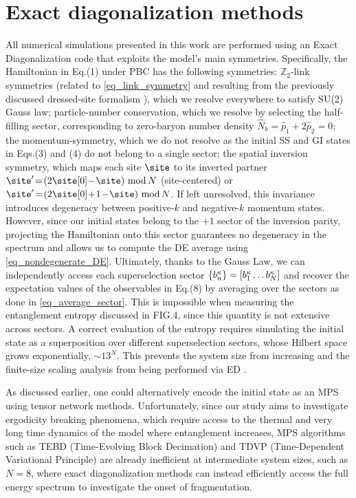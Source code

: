 \documentclass[aps,prl,reprint,twocolumn,superscriptaddress,floatfix,nofootinbib]{revtex4-2}
\begin{document}
\section{Exact diagonalization methods}
All numerical simulations presented in this work are performed using an Exact Diagonalization code \cite{Cataldi2026EdlgtExactDiagonalization, Cataldi2026DataCodeDisorderFree} that exploits the model's main symmetries.
Specifically, the Hamiltonian in Eq.(1) under PBC has the following symmetries: $\mathbb{Z}_{2}$-link symmetries (related to  \cref{eq_link_symmetry} and resulting from the previously discussed dressed-site formalism \cite{Cataldi2024Simulating2+1DSU2, Calajo2024DigitalQuantumSimulation, Calajo2025QuantumManybodyScarring}), which we resolve everywhere to satisfy SU(2) Gauss law; particle-number conservation, which we resolve by selecting the half-filling sector, corresponding to zero-baryon number density $\hat{N}_{b}\!=\!\hat{p}_{1}\!+\!2\hat{p}_{2}\!=\!0$; the momentum-symmetry, which we do not resolve as the initial SS and GI states in Eqs.(3) and (4) do not belong to a single sector; the spatial inversion symmetry, which maps each site $\site$ to its inverted partner $\site^{\prime}\!=\!(2\site[0]\!-\!\site)\!\!\mod\!N$ (site-centered) or $\site^{\prime}\!=\!(2\site[0]\!+\!1\!-\!\site)\!\!\mod \!N$.
If left unresolved, this invariance introduces degeneracy between positive-$k$ and negative-$k$ momentum states.
However, since our initial states belong to the $+1$ sector of the inversion parity, projecting the Hamiltonian onto this sector guarantees no degeneracy in the spectrum and allows us to compute the DE average using \cref{eq_nondegenerate_DE}.
Ultimately, thanks to the Gauss Law, we can independently access each superselection sector  $\qty{b^{\kappa}_{n}}=\qty[b^{\kappa}_{1}\dots b^{\kappa}_{N}]$ and recover the expectation values of the observables in Eq.(8) by averaging over the sectors as done in \cref{eq_average_sector}.
This is impossible when measuring the entanglement entropy discussed in FIG.4, since this quantity is not extensive across sectors.
A correct evaluation of the entropy requires simulating the initial state as a superposition over different superselection sectors, whose Hilbert space grows exponentially, $\sim 13^{N}$.
This prevents the system size from increasing and the finite-size scaling analysis from being performed via ED \cite{Cataldi2026EdlgtExactDiagonalization}.

As discussed earlier, one could alternatively encode the initial state as an MPS using tensor network methods.
Unfortunately, since our study aims to investigate ergodicity breaking phenomena, which require access to the thermal and very long time dynamics of the model where entanglement increases, MPS algorithms such as TEBD (Time-Evolving Block Decimation) \cite{Vidal2004EfficientSimulationOneDimensional} and TDVP (Time-Dependent Variational Principle) \cite{Haegeman2011TimeDependentVariationalPrinciple} are already inefficient at intermediate system sizes, such as $N=8$, where exact diagonalization methods can instead efficiently access the full energy spectrum to investigate the onset of fragmentation.
%
\end{document}
